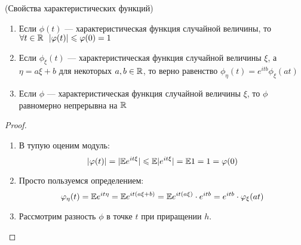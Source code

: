 \begin{lemma} (Свойства характеристических функций)
	\begin{enumerate}
		\item Если $\phi(t)$ --- характеристическая функция случайной величины, то \(\forall t \in \mathbb{R}\ \ |\varphi(t)| \leqslant \varphi(0) = 1\)
		
		\item Если $\phi_\xi(t)$ --- характеристическая функция случайной величины $\xi$, а $\eta = a\xi + b$ для некоторых $a, b \in \mathbb{R}$, то верно равенство \(\phi_\eta(t) = e^{itb}\phi_\xi(at)\)
		
		\item Если $\phi$ --- характеристическая функция случайной величины $\xi$, то $\phi$ равномерно непрерывна на $\mathbb{R}$
	\end{enumerate}
\end{lemma}

\begin{proof}
	\begin{enumerate}
		\item В тупую оценим модуль:
		\[
			|\varphi(t)| = |\mathbb{E} e^{it\xi}| \leqslant \mathbb{E}|e^{it\xi}| = \mathbb{E} 1 = 1 = \varphi(0)
		\]
		
		\item Просто пользуемся определением:
		\[
			\varphi_\eta(t) = \mathbb{E} e^{it\eta} = \mathbb{E} e^{it(a\xi + b)} = \mathbb{E} e^{it(a\xi)} \cdot e^{itb} = e^{itb} \cdot \varphi_\xi(at)
		\]
		
		\item Рассмотрим разность $\phi$ в точке $t$ при приращении $h$.
	\end{enumerate}
\end{proof}